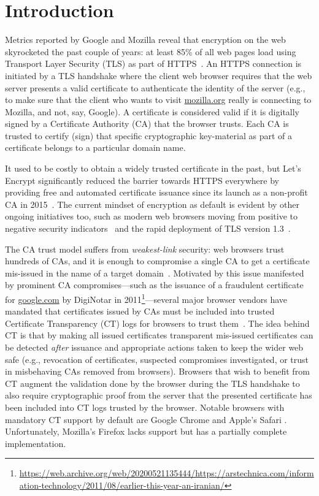 \section{Introduction} \label{sec:introduction}
Metrics reported by Google and Mozilla reveal that encryption on the web
skyrocketed the past couple of years: at least 85\% of all web pages load using
Transport Layer Security (TLS) as part of
HTTPS~\cite{google-metrics,mozilla-metrics}. An HTTPS connection is initiated by
a TLS handshake where the client web browser requires that the web server
presents a valid certificate to authenticate the identity of the server (e.g.,
to make sure that the client who wants to visit \url{mozilla.org} really is
connecting to Mozilla, and not, say, Google). A certificate is considered valid
if it is digitally signed by a Certificate Authority (CA) that the browser
trusts. Each CA is trusted to certify (sign) that specific cryptographic
key-material as part of a certificate belongs to a particular domain name.

It used to be costly to obtain a widely trusted certificate in the past, but
Let's Encrypt significantly reduced the barrier towards HTTPS everywhere by
providing free and automated certificate issuance since its launch as a
non-profit CA in 2015~\cite{le}. The current mindset of encryption as default is
evident by other ongoing initiatives too, such as modern web browsers moving
from positive to negative security indicators~\cite{chrome-ui,firefox-ui} and
the rapid deployment of TLS version 1.3~\cite{rapid-tls13}.

The CA trust model suffers from \emph{weakest-link} security: web browsers trust
hundreds of CAs, and it is enough to compromise a single CA to get a certificate
mis-issued in the name of a target domain~\cite{ca-ecosystem,https-sok}.
Motivated by this issue manifested by prominent CA compromises---such as the
issuance of a fraudulent certificate for \url{google.com} by DigiNotar in
2011\footnote{\url{https://web.archive.org/web/20200521135444/https://arstechnica.com/information-technology/2011/08/earlier-this-year-an-iranian/}}---several
major browser vendors have mandated that certificates issued by CAs must be
included into trusted Certificate Transparency (CT) logs for browsers to trust
them~\cite{ct/a,ct,ct/bis}. The idea behind CT is that by making all issued
certificates transparent mis-issued certificates can be detected \emph{after}
issuance and appropriate actions taken to keep the wider web safe (e.g.,
revocation of certificates, suspected compromises investigated, or trust in
misbehaving CAs removed from browsers). Browsers that wish to benefit from CT
augment the validation done by the browser during the TLS handshake to also
require cryptographic proof from the server that the presented certificate has
been included into CT logs trusted by the browser. Notable browsers with
mandatory CT support by default are Google Chrome and Apple's Safari
\cite{chrome-policy,safari-policy}. Unfortunately, Mozilla's Firefox lacks
support but has a partially complete implementation.

